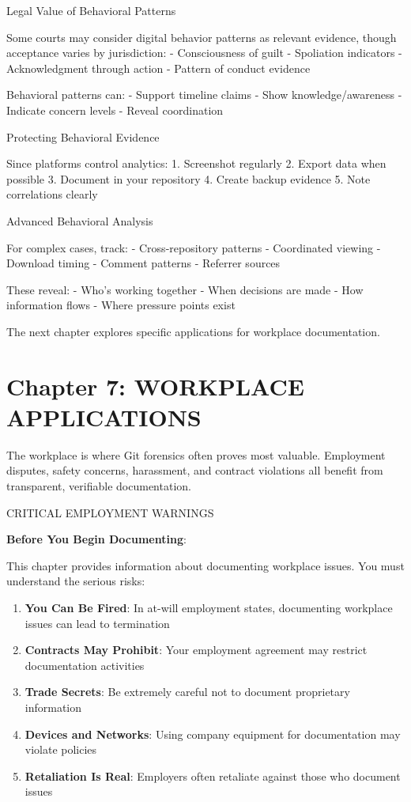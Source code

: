 Legal Value of Behavioral Patterns

Some courts may consider digital behavior patterns as relevant evidence,
though acceptance varies by jurisdiction: - Consciousness of guilt -
Spoliation indicators - Acknowledgment through action - Pattern of
conduct evidence

Behavioral patterns can: - Support timeline claims - Show
knowledge/awareness - Indicate concern levels - Reveal coordination

Protecting Behavioral Evidence

Since platforms control analytics: 1. Screenshot regularly 2. Export
data when possible 3. Document in your repository 4. Create backup
evidence 5. Note correlations clearly

Advanced Behavioral Analysis

For complex cases, track: - Cross-repository patterns - Coordinated
viewing - Download timing - Comment patterns - Referrer sources

These reveal: - Who's working together - When decisions are made - How
information flows - Where pressure points exist

The next chapter explores specific applications for workplace
documentation.

\section{Chapter 7: WORKPLACE
APPLICATIONS}\label{chapter-7-workplace-applications}

The workplace is where Git forensics often proves most valuable.
Employment disputes, safety concerns, harassment, and contract
violations all benefit from transparent, verifiable documentation.

CRITICAL EMPLOYMENT WARNINGS

\textbf{Before You Begin Documenting}:

This chapter provides information about documenting workplace issues.
You must understand the serious risks:

\begin{enumerate}
\def\labelenumi{\arabic{enumi}.}
\tightlist
\item
  \textbf{You Can Be Fired}: In at-will employment states, documenting
  workplace issues can lead to termination
\item
  \textbf{Contracts May Prohibit}: Your employment agreement may
  restrict documentation activities
\item
  \textbf{Trade Secrets}: Be extremely careful not to document
  proprietary information
\item
  \textbf{Devices and Networks}: Using company equipment for
  documentation may violate policies
\item
  \textbf{Retaliation Is Real}: Employers often retaliate against those
  who document issues
\end{enumerate}


